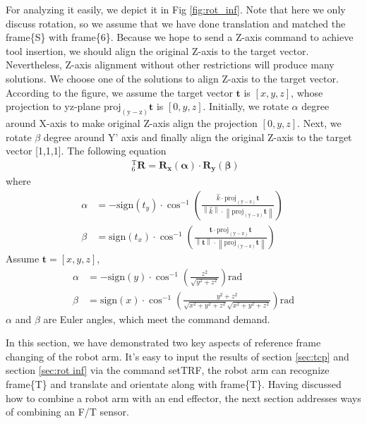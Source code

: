 For analyzing it easily, we depict it in Fig \ref{fig:rot_inf}. Note that here we only discuss rotation, so we assume that we have done translation and matched the frame\{S\} with frame\{6\}. Because we hope to send a Z-axis command to achieve tool insertion, we should align the original Z-axis to the target vector. Nevertheless, Z-axis alignment without other restrictions will produce many solutions. We choose one of the solutions to align Z-axis to the target vector. According to the figure, we assume the target vector $\boldsymbol{t}$ is $\left[x,y,z\right]$, whose projection to yz-plane $\mathrm{proj_{(y-z)}}\boldsymbol{t}$ is $\left[0,y,z\right]$. Initially, we rotate $\alpha$ degree around X-axis to make original Z-axis align the projection $\left[0,y,z\right]$. Next, we rotate $\beta$ degree around Y' axis and finally align the original Z-axis to the target vector [1,1,1]. The following equation 
\begin{equation}
\begin{split}
\ \  _{\mathrm{6}}^{\mathrm{T}}\mathbf{R} = \mathbf{R_x(\alpha)} \cdot \mathbf{R_y(\beta)}
\end{split}
\end{equation}
where
\begin{equation}
\begin{split}
\alpha &= 
-\mathrm{sign}(t_y)\cdot \cos^{-1} \left(  \frac{\hat{k}						\cdot 		\mathrm{proj_{(y-z)}}\boldsymbol{t}				}
								 				{\left \| \hat{k} \right \| 	\cdot \left \| \mathrm{proj_{(y-z)}}\boldsymbol{t} \right \|} \right)\ \\
\beta  &= 
\mathrm{sign}(t_x)\cdot \cos^{-1} \left( \frac{\textbf{t}							\cdot 		\mathrm{proj_{(y-z)}}\boldsymbol{t}			}
								  			  {\left \| \textbf{t}\right \| 	\cdot \left \| \mathrm{proj_{(y-z)}}\boldsymbol{t} \right \|} \right)\ 
\end{split}
\end{equation}
Assume $\boldsymbol{t} = [x,y,z]$,
\begin{equation}
\begin{split}
\alpha &= 
-\mathrm{sign}(y)\cdot \cos^{-1}	\left( \frac{z^2}{\sqrt{y^2+z^2}} \right) \mathrm{rad}\\
\beta  &= 
\mathrm{sign}(x)\cdot \cos^{-1} \left( \frac{y^2+z^2}{\sqrt{x^2+y^2+z^2}\sqrt{x^2+y^2+z^2}} \right) \mathrm{rad}
\end{split}
\end{equation}
$\alpha$ and $\beta$ are Euler angles, which meet the command demand.
\par
In this section, we have demonstrated two key aspects of reference frame changing of the robot arm. It's easy to input the results of section \ref{sec:tcp} and section \ref{sec:rot inf} via the command setTRF, the robot arm can recognize frame\{T\} and translate and orientate along with frame\{T\}. Having discussed how to combine a robot arm with an end effector, the next section addresses ways of combining an F/T sensor.